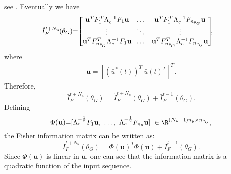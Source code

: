 \documentclass{ifacconf}
\begin{document}
see \cite{Manchester}. Eventually we have
\begin{eqnarray}
\begin{split}
\tilde{I}_F^{t+N_u}\hspace{-0.05cm}(\theta_G) \hspace{-0.10cm}	&=\hspace{-0.1cm}	
															\begin{bmatrix}
															\textbf{u}^T F_1^T \Lambda_e^{-1} F_1 \textbf{u} 					& \hspace{-0.10cm}\ldots 	& \textbf{u}^T F_1^T \Lambda_e^{-1} F_{n_{\theta_G}} \textbf{u} \\
																						\vdots                                       							&\hspace{-0.10cm} \ddots 	&                                    \vdots 												 \\
															\textbf{u}^T F_{n_{\theta_G}}^T \Lambda_e^{-1} F_1 \textbf{u} 	& \hspace{-0.10cm}\ldots 	& \textbf{u}^T F_{n_{\theta_G}}^T \Lambda_e^{-1} F_{n_{\theta_G}} \textbf{u}
																\end{bmatrix}
																\hspace{-0.15cm},
\end{split}
\end{eqnarray}
where 
\begin{align}\label{u}
\textbf{u} =\left[(\bar{u}^*(t))^T \ \bar{u}(t)^T \right]^T.
\end{align}
Therefore,
\begin{equation}
\bar{I}_F^{t+N_u}(\theta_G) = \tilde{I}_F^{t+N_u}(\theta_G) + \bar{I}_F^{t-1}(\theta_G).
\end{equation}
Defining
\begin{equation}
\label{Phiu}
\Phi(\textbf{u}) \hspace{-0.1cm} = \hspace{-0.1cm} [\Lambda_e^{-\frac{1}{2}}F_1 \textbf{u} , \ \ldots, \ \Lambda_e^{-\frac{1}{2}}F_{n_{\theta}} \textbf{u}]\ \in \R^{(N_u+1)n_y\times n_{\theta_G}},
\end{equation}
the Fisher information matrix can be written as:
\begin{equation} \label{Eq:QuadraticFIM}
\bar{I}_F^{t+N_u}(\theta_G) =  \Phi(\textbf{u})^T\Phi(\textbf{u})+ \bar{I}_F^{t-1}(\theta_G).
\end{equation}
Since $\Phi(\textbf{u})$ is linear in $\textbf{u}$, one can see that the information matrix is a quadratic function of the input sequence.
\vspace{0cm}
\end{document}
